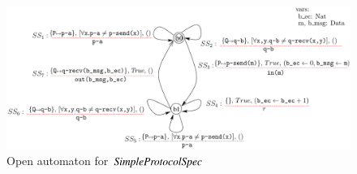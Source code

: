 \documentclass{elsarticle}
\newcommand{\TODO}[1]{\textcolor{red}{\textbf{[TODO:#1]}}}
\begin{document}









\begin{figure}[ht]
   \centerline{\includegraphics[width=\linewidth]{XFIG/SPSpecOpen}}
   \caption{Open automaton for  $\symb{SimpleProtocolSpec}$}
   \label{SimpleProtCounter:SpecOA}
\end{figure}
\end{document}
